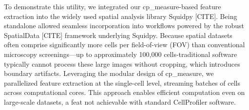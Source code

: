 \documentclass{article}
\begin{document}
To demonstrate this utility, we integrated our cp\_measure-based feature extraction into the widely used spatial analysis library Squidpy [CITE]. Being standalone allowed seamless incorporation into workflows powered by the robust SpatialData [CITE] framework underlying Squidpy. Because spatial datasets often comprise significantly more cells per field-of-view (FOV) than conventional microscopy screenings—up to approximately 100,000 cells-traditional software typically cannot process these large images without cropping, which introduces boundary artifacts. Leveraging the modular design of cp\_measure, we parallelized feature extraction at the single-cell level, streaming batches of cells across computational cores. This approach enables efficient computation even on large-scale datasets, a feat not achievable with standard CellProfiler software.
\end{document}
